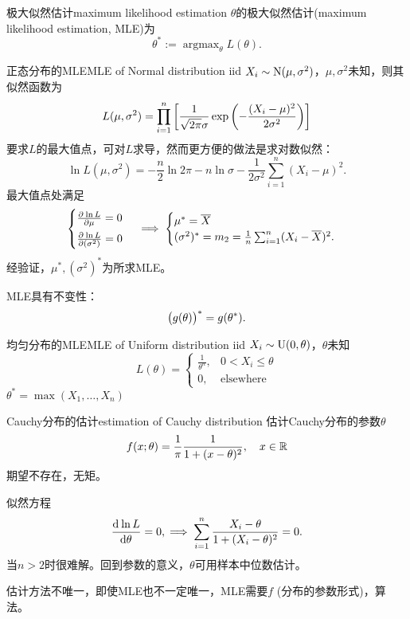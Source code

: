 \begin{definition}{极大似然估计}{maximum likelihood estimation}
	$\theta$的极大似然估计(maximum likelihood estimation, MLE)为
	\begin{equation}
		\theta^\ast:=\mathop{\arg\max}_\theta L(\theta).
	\end{equation}
\end{definition}
\begin{example}{正态分布的MLE}{MLE of Normal distribution}
	iid $X_i\sim\operatorname{N}(\mu,\sigma^2)$，$\mu,\sigma^2$未知，则其似然函数为
	\[
		L(\mu,\sigma^2)=\prod_{i=1}^n\left[\frac1{\sqrt{2\pi}\sigma}\exp\left(-\frac{(X_i-\mu)^2}{2\sigma^2}\right)\right]
	\]
	要求$L$的最大值点，可对$L$求导，然而更方便的做法是求对数似然：
	\[
		\ln L(\mu,\sigma^2)=-\frac n2\ln2\pi-n\ln\sigma-\frac1{2\sigma^2}\sum_{i=1}^n(X_i-\mu)^2.
	\]
	最大值点处满足
	\[
		\begin{cases}
			\frac{\partial^{{}}\ln L}{\partial{\mu}^{{}}}=0\\[1ex]
			\frac{\partial^{{}}\ln L}{\partial{(\sigma^2)}^{{}}}=0
		\end{cases}\implies
		\begin{cases}
			\mu^\ast=\overline{X}\\
			(\sigma^2)^\ast=m_2=\frac1n\sum_{i=1}^n(X_i-\overline{X})^2.
		\end{cases}
	\]
	经验证，$\mu^\ast,(\sigma^2)^\ast$为所求MLE。
\end{example}
\begin{remark}
	MLE具有不变性：
	\begin{equation}
		\bigl(g(\theta)\bigr)^\ast=g(\theta^\ast).
	\end{equation}
\end{remark}
\begin{example}{均匀分布的MLE}{MLE of Uniform distribution}
	iid $X_i\sim\operatorname{U}(0,\theta)$，$\theta$未知
	\[
		L(\theta)=\begin{cases}
			\frac1{\theta^n},&0<X_i\leqslant\theta\\
			0,&\text{elsewhere}
		\end{cases}
	\]
	$\theta^\ast=\max(X_1,\ldots,X_n)$
\end{example}
\begin{example}{Cauchy分布的估计}{estimation of Cauchy distribution}
	估计Cauchy分布的参数$\theta$
	\[
		f(x;\theta)=\frac1\pi\frac1{1+(x-\theta)^2},\quad x\in\mathbb R
	\]
	期望不存在，无矩。
	
	似然方程
	\[
		\frac{\mathrm{d}^{{}}\ln L}{\mathrm{d}{\theta}^{{}}}=0,\implies\sum_{i=1}^n\frac{X_i-\theta}{1+(X_i-\theta)^2}=0.
	\]
	当$n>2$时很难解。回到参数的意义，$\theta$可用样本中位数估计。
\end{example}
估计方法不唯一，即使MLE也不一定唯一，MLE需要$f$ (分布的参数形式)，算法。

